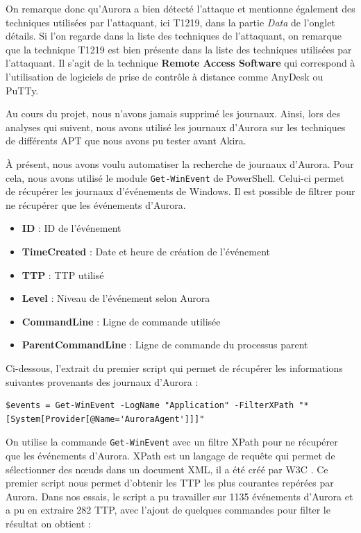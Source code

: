 \documentclass[12pt,letterpaper]{article}
\begin{document}
\bigskip

On remarque donc qu'Aurora a bien détecté l'attaque et mentionne également des techniques utilisées par l'attaquant, ici T1219, dans la partie \textit{Data} de l'onglet détails.
Si l'on regarde dans la liste des techniques de l'attaquant, on remarque que la technique T1219 est bien présente dans la liste des techniques utilisées par l'attaquant.
Il s'agit de la technique \textbf{Remote Access Software} qui correspond à l'utilisation de logiciels de prise de contrôle à distance comme AnyDesk ou PuTTy.

\bigskip

Au cours du projet, nous n'avons jamais supprimé les journaux.
Ainsi, lors des analyses qui suivent, nous avons utilisé les journaux d'Aurora sur les techniques de différents APT que nous avons pu tester avant Akira.

\newpage

À présent, nous avons voulu automatiser la recherche de journaux d'Aurora.
Pour cela, nous avons utilisé le module \verb|Get-WinEvent| de PowerShell.
Celui-ci permet de récupérer les journaux d'événements de Windows.
Il est possible de filtrer pour ne récupérer que les événements d'Aurora.
\begin{itemize}
    \item \textbf{ID} : ID de l'événement
    \item \textbf{TimeCreated} : Date et heure de création de l'événement
    \item \textbf{TTP} : TTP utilisé
    \item \textbf{Level} : Niveau de l'événement selon Aurora
    \item \textbf{CommandLine} : Ligne de commande utilisée
    \item \textbf{ParentCommandLine} : Ligne de commande du processus parent
\end{itemize}

Ci-dessous, l'extrait du premier script qui permet de récupérer les informations suivantes provenants des journaux d'Aurora :

\begin{lstlisting}[caption={Récupération des journaux d'Aurora}, label={lst:aurora_logs}]
$events = Get-WinEvent -LogName "Application" -FilterXPath "*[System[Provider[@Name='AuroraAgent']]]"
\end{lstlisting}

On utilise la commande \verb|Get-WinEvent| avec un filtre XPath pour ne récupérer que les événements d'Aurora.
XPath est un langage de requête qui permet de sélectionner des nœuds dans un document XML, il a été créé par W3C \cite{XMLPathLanguage}.
Ce premier script nous permet d'obtenir les TTP les plus courantes repérées par Aurora.
Dans nos essais, le script a pu travailler sur 1135 événements d'Aurora et a pu en extraire 282 TTP, avec l'ajout de quelques commandes pour filter le résultat on obtient :
\end{document}
